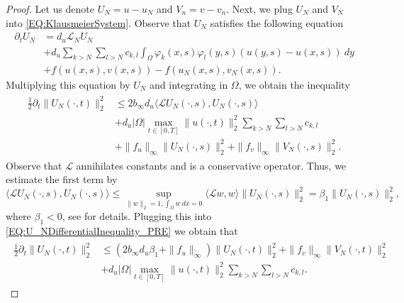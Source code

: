 \documentclass[12pt, a4paper]{article}
\theoremstyle{break}
\theoremstyle{break}
\theoremstyle{break}
\theoremstyle{break}
\theoremstyle{break}
\theoremstyle{break}
\theoremstyle{break}
\begin{document}
\begin{proof}
    Let us denote $U_N = u - u_N$ and $V_n = v - v_n$. Next, we plug $U_N$ and $V_N$ into \eqref{EQ:KlausmeierSystem}. Observe that $U_N$ satisfies the following equation
    \begin{align*}
        \partial_t U_N 
        &= d_u \mathcal{L}_N U_N \\
        &+ d_u \sum_{k > N}\sum_{l > N} c_{k, l}\int_\Omega \varphi_k(x, s) \varphi_l(y, s) (u(y, s) - u(x, s))\:dy \\
        &+ f(u(x,s), v(x,s)) - f(u_N(x,s), v_N(x,s)).
    \end{align*}
    Multiplying this equation by $U_N$ and integrating in $\Omega$, we obtain the inequality
    \begin{align}
        \label{EQ:U_NDifferentialInequality_PRE}
        \begin{split}
            \frac{1}{2}\partial_t\|U_N(\cdot, t)\|_2^2 
            &\leq 2 b_\infty d_u  \langle \mathcal{L} U_N(\cdot, s), U_N(\cdot, s)\rangle \\
            &+ d_u |\Omega| \max_{t \in [0, T]}\|u(\cdot, t)\|_2^2 \sum_{k > N}\sum_{l > N} c_{k, l} \\
            &+ \|f_u\|_\infty \|U_N(\cdot, s)\|_2^2  + \|f_v\|_\infty \|V_N(\cdot, s)\|_2^2.
        \end{split}
    \end{align}
    Observe that $\mathcal{L}$ annihilates constants and is a conservative operator. Thus, we estimate the first term by
    \begin{equation*}
        \langle \mathcal{L} U_N(\cdot, s), U_N(\cdot, s)\rangle
        \leq
        \sup_{\|w\|_2 = 1, \int_\Omega w \:dx = 0} \langle \mathcal{L}w, w \rangle \|U_N(\cdot, s)\|_2^2 = \beta_1 \|U_N(\cdot, s)\|_2^2,
    \end{equation*}
    where $\beta_1 < 0$, see \cite{ChasseigneChavesRossi2006} for details. Plugging this into \eqref{EQ:U_NDifferentialInequality_PRE} we obtain that
    \begin{align}
        \label{EQ:U_NDifferentialInequality_Final}
        \begin{split}
            \frac{1}{2}\partial_t\|U_N(\cdot, t)\|_2^2
            &\leq (2 b_\infty d_u \beta_1 + \|f_u\|_\infty) \|U_N(\cdot, t)\|_2^2 + \|f_v\|_\infty \|V_N(\cdot, t)\|_2^2 \\
            &+ d_u |\Omega| \max_{t \in [0, T]}\|u(\cdot, t)\|_2^2 \sum_{k > N}\sum_{l > N} c_{k, l}.
        \end{split}

\end{align}
\end{proof}
\end{document}
